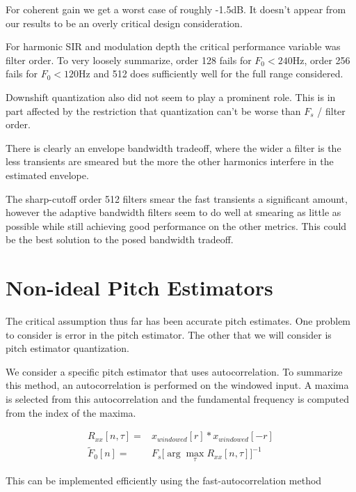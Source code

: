 \documentclass [11pt, proquest,oneside] {uwthesis}[2015/03/03]
\begin{document}
For coherent gain we get a worst case of roughly -1.5dB.  It doesn't appear from our results to be an overly critical design consideration.

For harmonic SIR and modulation depth the critical performance variable was filter order.  To very loosely summarize, order 128 fails for $F_0 < 240$Hz, order 256 fails for $F_0 < 120$Hz and 512 does sufficiently well for the full range considered.

Downshift quantization also did not seem to play a prominent role.  This is in part affected by the restriction that quantization can't be worse than $F_s$ / filter order.

There is clearly an envelope bandwidth tradeoff, where the wider a filter is the less transients are smeared but the more the other harmonics interfere in the estimated envelope.

The sharp-cutoff order 512 filters smear the fast transients a significant amount, however the adaptive bandwidth filters seem to do well at smearing as little as possible while still achieving good performance on the other metrics.  This could be the best solution to the posed bandwidth tradeoff.


\section{Non-ideal Pitch Estimators}

The critical assumption thus far has been accurate pitch estimates.  One problem to consider is error in the pitch estimator.  The other that we will consider is pitch estimator quantization.

We consider a specific pitch estimator that uses autocorrelation.  To summarize this method, an autocorrelation is performed on the windowed input.  A maxima is selected from this autocorrelation and the fundamental frequency is computed from the index of the maxima.

\begin{align}
R_{xx}[n,\tau] =& x_{windowed}[r] * x_{windowed}[-r] \\
\tilde{F}_0[n] =& F_s \Bigg[ \arg\max_\tau R_{xx}[n,\tau] \Bigg]^{-1}
\end{align}

This can be implemented efficiently using the fast-autocorrelation method
\end{document}
